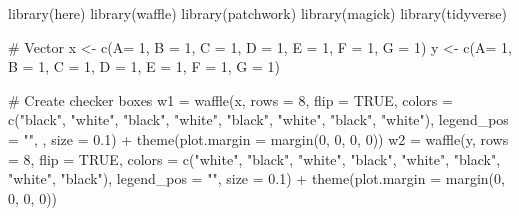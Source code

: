 \documentclass[
  letterpaper,
  DIV=11,
  numbers=noendperiod]{scrreprt}
\newenvironment{Shaded}{\begin{snugshade}}{\end{snugshade}}
\newcommand{\AttributeTok}[1]{\textcolor[rgb]{0.40,0.45,0.13}{#1}}
\newcommand{\CommentTok}[1]{\textcolor[rgb]{0.37,0.37,0.37}{#1}}
\newcommand{\ConstantTok}[1]{\textcolor[rgb]{0.56,0.35,0.01}{#1}}
\newcommand{\DecValTok}[1]{\textcolor[rgb]{0.68,0.00,0.00}{#1}}
\newcommand{\FloatTok}[1]{\textcolor[rgb]{0.68,0.00,0.00}{#1}}
\newcommand{\FunctionTok}[1]{\textcolor[rgb]{0.28,0.35,0.67}{#1}}
\newcommand{\NormalTok}[1]{\textcolor[rgb]{0.00,0.23,0.31}{#1}}
\newcommand{\OtherTok}[1]{\textcolor[rgb]{0.00,0.23,0.31}{#1}}
\newcommand{\SpecialCharTok}[1]{\textcolor[rgb]{0.37,0.37,0.37}{#1}}
\newcommand{\StringTok}[1]{\textcolor[rgb]{0.13,0.47,0.30}{#1}}
\begin{document}
\begin{Shaded}
\begin{Highlighting}[]
\FunctionTok{library}\NormalTok{(here)}
\FunctionTok{library}\NormalTok{(waffle)}
\FunctionTok{library}\NormalTok{(patchwork)}
\FunctionTok{library}\NormalTok{(magick)}
\FunctionTok{library}\NormalTok{(tidyverse)}

\CommentTok{\# Vector}
\NormalTok{x }\OtherTok{\textless{}{-}} \FunctionTok{c}\NormalTok{(}\AttributeTok{A=} \DecValTok{1}\NormalTok{, }\AttributeTok{B =} \DecValTok{1}\NormalTok{, }\AttributeTok{C =} \DecValTok{1}\NormalTok{, }\AttributeTok{D =} \DecValTok{1}\NormalTok{, }\AttributeTok{E =} \DecValTok{1}\NormalTok{, }\AttributeTok{F =} \DecValTok{1}\NormalTok{, }\AttributeTok{G =} \DecValTok{1}\NormalTok{)}
\NormalTok{y }\OtherTok{\textless{}{-}} \FunctionTok{c}\NormalTok{(}\AttributeTok{A=} \DecValTok{1}\NormalTok{, }\AttributeTok{B =} \DecValTok{1}\NormalTok{, }\AttributeTok{C =} \DecValTok{1}\NormalTok{, }\AttributeTok{D =} \DecValTok{1}\NormalTok{, }\AttributeTok{E =} \DecValTok{1}\NormalTok{, }\AttributeTok{F =} \DecValTok{1}\NormalTok{, }\AttributeTok{G =} \DecValTok{1}\NormalTok{)}

\CommentTok{\# Create checker boxes}
\NormalTok{w1 }\OtherTok{=} \FunctionTok{waffle}\NormalTok{(x, }\AttributeTok{rows =} \DecValTok{8}\NormalTok{, }\AttributeTok{flip =} \ConstantTok{TRUE}\NormalTok{, }\AttributeTok{colors =} \FunctionTok{c}\NormalTok{(}\StringTok{"black"}\NormalTok{, }\StringTok{"white"}\NormalTok{, }\StringTok{"black"}\NormalTok{, }\StringTok{"white"}\NormalTok{, }\StringTok{"black"}\NormalTok{, }\StringTok{"white"}\NormalTok{, }\StringTok{"black"}\NormalTok{, }\StringTok{"white"}\NormalTok{), }\AttributeTok{legend\_pos =} \StringTok{""}\NormalTok{, , }\AttributeTok{size =} \FloatTok{0.1}\NormalTok{) }\SpecialCharTok{+} 
  \FunctionTok{theme}\NormalTok{(}\AttributeTok{plot.margin =} \FunctionTok{margin}\NormalTok{(}\DecValTok{0}\NormalTok{, }\DecValTok{0}\NormalTok{, }\DecValTok{0}\NormalTok{, }\DecValTok{0}\NormalTok{))}
\NormalTok{w2 }\OtherTok{=} \FunctionTok{waffle}\NormalTok{(y, }\AttributeTok{rows =} \DecValTok{8}\NormalTok{, }\AttributeTok{flip =} \ConstantTok{TRUE}\NormalTok{, }\AttributeTok{colors =} \FunctionTok{c}\NormalTok{(}\StringTok{"white"}\NormalTok{, }\StringTok{"black"}\NormalTok{, }\StringTok{"white"}\NormalTok{, }\StringTok{"black"}\NormalTok{, }\StringTok{"white"}\NormalTok{, }\StringTok{"black"}\NormalTok{, }\StringTok{"white"}\NormalTok{, }\StringTok{"black"}\NormalTok{), }\AttributeTok{legend\_pos =} \StringTok{""}\NormalTok{, }\AttributeTok{size =} \FloatTok{0.1}\NormalTok{) }\SpecialCharTok{+}
  \FunctionTok{theme}\NormalTok{(}\AttributeTok{plot.margin =} \FunctionTok{margin}\NormalTok{(}\DecValTok{0}\NormalTok{, }\DecValTok{0}\NormalTok{, }\DecValTok{0}\NormalTok{, }\DecValTok{0}\NormalTok{))}


\end{Highlighting}
\end{Shaded}
\end{document}

